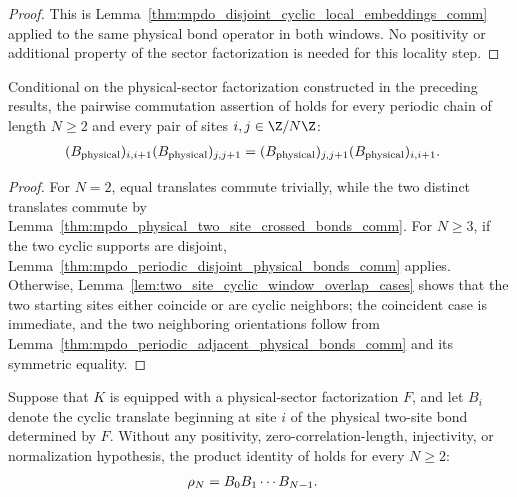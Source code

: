 \begin{proof}\leanok
    This is Lemma~\ref{thm:mpdo_disjoint_cyclic_local_embeddings_comm}
    applied to the same physical bond operator in both windows. No positivity
    or additional property of the sector factorization is needed for this
    locality step.
\end{proof}

\begin{lemma}
    \label{thm:mpdo_periodic_pairwise_physical_bonds_comm}
    \leanok
    Conditional on the physical-sector factorization constructed in the
    preceding results, the pairwise commutation assertion of
    \cite[Appendix~C.2, Proposition~C.8, lines~1571--1593]
    {Cirac2016MPDO_arXiv} holds for every periodic chain of length $N\geq2$ and
    every pair of sites $i,j\in\Z/N\Z$:
    \begin{align}
        (B_{\mathrm{physical}})_{i,i+1}
        (B_{\mathrm{physical}})_{j,j+1}
         & =
        (B_{\mathrm{physical}})_{j,j+1}
        (B_{\mathrm{physical}})_{i,i+1}.
        \notag
    \end{align}
\end{lemma}

\begin{proof}
    \leanok
    For $N=2$, equal translates commute trivially, while the two distinct
    translates commute by
    Lemma~\ref{thm:mpdo_physical_two_site_crossed_bonds_comm}. For $N\geq3$,
    if the two cyclic supports are disjoint,
    Lemma~\ref{thm:mpdo_periodic_disjoint_physical_bonds_comm} applies.
    Otherwise, Lemma~\ref{lem:two_site_cyclic_window_overlap_cases} shows that
    the two starting sites either coincide or are cyclic neighbors; the
    coincident case is immediate, and the two neighboring orientations follow
    from Lemma~\ref{thm:mpdo_periodic_adjacent_physical_bonds_comm} and its
    symmetric equality.
\end{proof}

\begin{lemma}
    \label{thm:mpdo_exact_physical_sector_bond_product}
    \leanok
    Suppose that $K$ is equipped with a physical-sector factorization $F$, and
    let $B_i$ denote the cyclic translate beginning at site $i$ of the physical
    two-site bond determined by $F$. Without any positivity,
    zero-correlation-length, injectivity, or normalization hypothesis, the
    product identity of
    \cite[Appendix~C.2, Proposition~C.8, lines~1581--1593]
    {Cirac2016MPDO_arXiv} holds for every $N\geq2$:
    \begin{align}
        \rho_N
         & =B_0B_1\cdots B_{N-1}.
        \notag
    \end{align}
\end{lemma}

